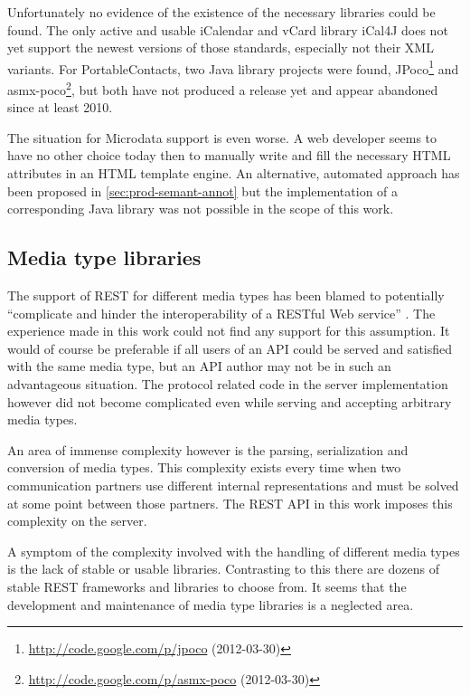 \documentclass[11pt,a4paper,headsepline,twoside]{scrartcl}		%
\newcommand{\citeurl}[2]{\url{#1} (#2)}
\begin{document}
Unfortunately no evidence of the existence of the necessary libraries could be
found. The only active and usable iCalendar and vCard library iCal4J does not
yet support the newest versions of those standards, especially not their XML
variants. For PortableContacts, two Java library projects were found,
JPoco\footnote{\citeurl{http://code.google.com/p/jpoco}{2012-03-30}} and
asmx-poco\footnote{\citeurl{http://code.google.com/p/asmx-poco}{2012-03-30}},
but both have not produced a release yet and appear abandoned since at least
2010.

The situation for Microdata support is even worse. A web developer seems to have
no other choice today then to manually write and fill the necessary HTML
attributes in an HTML template engine. An alternative, automated approach has
been proposed in \autoref{sec:prod-semant-annot} but the implementation of a
corresponding Java library was not possible in the scope of this work.

\subsection{Media type libraries}
\label{sec:mediatype-libraries}

The support of REST for different media types has been blamed to potentially
``complicate and hinder the interoperability of a RESTful Web
service'' \cite[sec. 7.2]{Pautasso2008}. The experience made
in this work could not find any support for this assumption. It would of course
be preferable if all users of an API could be served and satisfied with the
same media type, but an API author may not be in such an advantageous
situation. The protocol related code in the server implementation however did
not become complicated even while serving and accepting arbitrary media types.

An area of immense complexity however is the parsing, serialization and
conversion of media types. This complexity exists every time when two
communication partners use different internal representations and must be solved
at some point between those partners. The REST API in this work imposes this
complexity on the server.

A symptom of the complexity involved with the handling of different media types
is the lack of stable or usable libraries. Contrasting to this there are dozens
of stable REST frameworks and libraries to choose from. It seems that the
development and maintenance of media type libraries is a neglected area.
\end{document}
